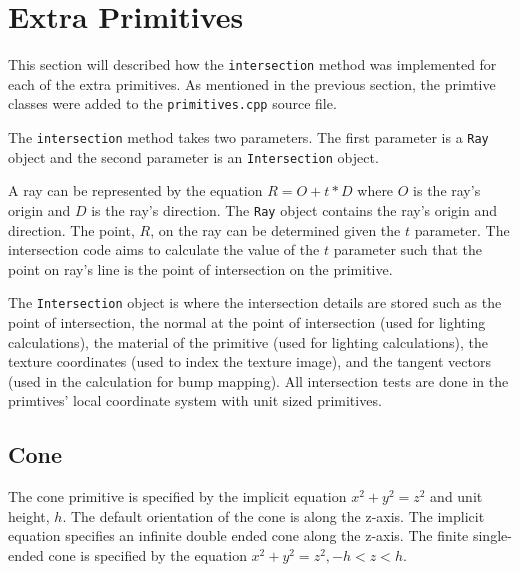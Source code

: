 \section{Extra Primitives}

This section will described how the \verb|intersection| method was
implemented for each of the extra primitives. As mentioned in the previous
section, the primtive classes were added to the \verb|primitives.cpp| source 
file.

The \verb|intersection| method takes two parameters. The first parameter is a
\verb|Ray| object and the second parameter is an \verb|Intersection| object. 

A ray can be represented by the equation $R = O + t*D$ where $O$ is the ray's 
origin and $D$ is the ray's direction. The \verb|Ray| object contains the ray's 
origin and direction. The point, $R$, on the ray can be determined given the $t$ 
parameter. The intersection code aims to calculate the value of the $t$ 
parameter such that the point on ray's line is the point of intersection on the 
primitive. 

The \verb|Intersection| object is where the intersection details are
stored such as the point of intersection, the normal at the point of
intersection (used for lighting calculations), the material of the primitive
(used for lighting calculations), the texture coordinates (used to index the
texture image), and the tangent vectors (used in the calculation for bump
mapping). All intersection tests are done in the primtives' local coordinate
system with unit sized primitives.

\subsection*{Cone}
The cone primitive is specified by the implicit equation $x^2 + y^2 = z^2$ and unit 
height, $h$. The default orientation of the cone is along the z-axis. The implicit 
equation specifies an infinite double ended cone along the z-axis. The finite 
single-ended cone is specified by the equation $x^2 + y^2 = z^2, -h < z < h$. 

